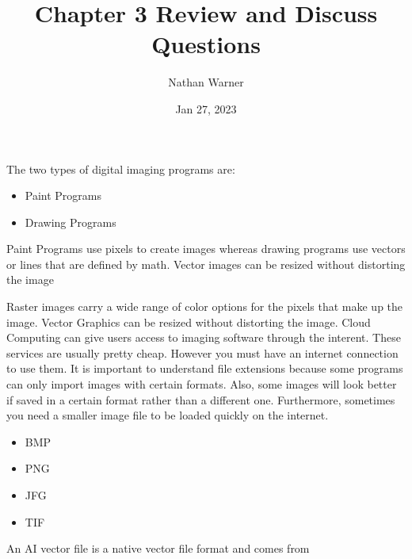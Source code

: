 \documentclass{report}
\title{\Huge{Chapter 3 Review and Discuss Questions}}
\author{\huge{Nathan Warner}}
\date{\huge{Jan 27, 2023}}
\begin{document}
    \maketitle
    \noindent The two types of digital imaging programs are:
    \begin{itemize}
        \item Paint Programs
        \item Drawing Programs
    \end{itemize}
    \noindent Paint Programs use pixels to create images whereas drawing programs use vectors
    or lines that are defined by math. Vector images can be resized without distorting the image
    \bigbreak \noindent 

    \noindent Raster images carry a wide range of color options for the pixels that make
    up the image.
    \bigbreak \noindent 
    \noindent Vector Graphics can be resized without distorting the image.
    \bigbreak \noindent 
    \noindent Cloud Computing can give users access to imaging software through the interent. 
    These services are usually pretty cheap. However you must have an internet connection to use them.
    \bigbreak \noindent 
    \noindent It is important to understand file extensions because some programs can only
    import images with certain formats. Also, some images will look better if saved in a 
    certain format rather than a different one. Furthermore, sometimes you need a smaller image file
    to be loaded quickly on the internet. 
    \bigbreak \noindent 
    \begin{itemize}
        \item BMP
        \item PNG
        \item JFG
        \item TIF
    \end{itemize}
    \bigbreak \noindent 
    \noindent An AI vector file is a native vector file format and comes from 
\end{document}
